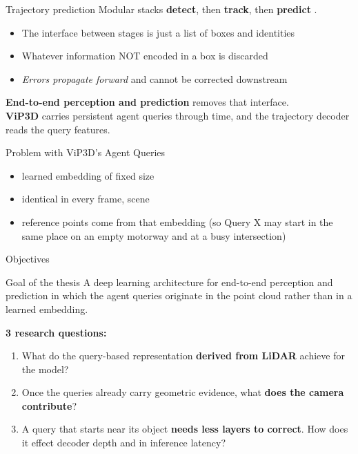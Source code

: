 \documentclass[aspectratio=169,11pt,t]{beamer}
\newcommand{\refcite}[1]{\textcolor{tuered}{\scriptsize\cite{#1}}}
\begin{document}
\begin{frame}{Trajectory prediction}
  Modular stacks \textbf{detect}, then \textbf{track}, then \textbf{predict} \refcite{chen2024end,Liang2020PnPNet}.
  \begin{itemize}
    \item The interface between stages is just a list of boxes and identities
    \item Whatever information NOT encoded in a box is discarded
    \item \emph{Errors propagate forward} and cannot be corrected downstream
  \end{itemize}


  \vspace{0.4em}
  \textbf{End-to-end perception and prediction} removes that interface.  \\
  \textbf{ViP3D}\refcite{Gu2023ViP3D} carries persistent \alert{agent queries through time}, and the trajectory
  decoder reads the query features.

  \vspace{0.4em}
  \begin{alertblock}{Problem with ViP3D's Agent Queries}
    \begin{itemize}
        \item learned embedding of fixed size
        \item identical in every frame, scene
        \item reference points come from that embedding (so Query X may start in the
          same place on an empty motorway and at a busy intersection)
    \end{itemize}
  \end{alertblock}
\end{frame}

\begin{frame}{Objectives}
  \begin{block}{Goal of the thesis}
    A deep learning architecture for end-to-end perception and prediction in
    which the agent queries \alert{originate in the point cloud} rather than in
    a learned embedding.
  \end{block}

  \vspace{0.4em}
  \textbf{3 research questions:}
  \begin{enumerate}
    \item What do the query-based representation \textbf{derived from LiDAR} achieve for the model?
    \item Once the queries already carry geometric evidence, what \textbf{does the
      camera contribute}?
    \item A query that starts near its object \textbf{needs less layers to correct}. How does it effect decoder depth and in inference latency?
  \end{enumerate}


  \vspace{0.4em}
\end{frame}
\end{document}
